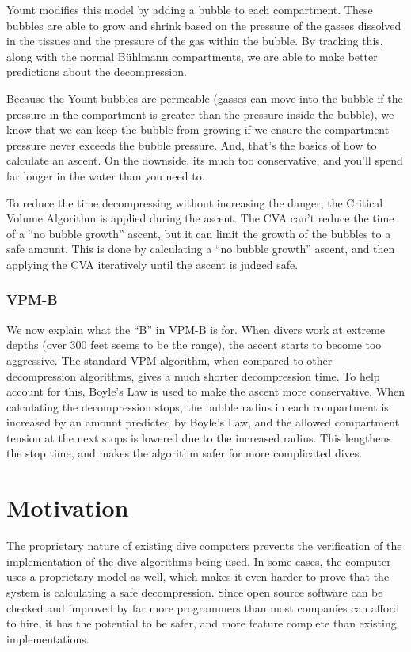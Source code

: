 \documentclass[12pt]{article}
\begin{document}
 Yount modifies this model by adding a bubble to each compartment. These bubbles are able to grow and
shrink based on the pressure of the gasses dissolved in the tissues and the pressure of the gas within the
bubble. By tracking this, along with the normal B\"uhlmann compartments, we are able to make better
predictions about the decompression.

Because the Yount bubbles are permeable (gasses can move into the bubble if the pressure in the compartment
is greater than the pressure inside the bubble), we know that we can keep the bubble from growing if we
ensure the compartment pressure never exceeds the bubble pressure. And, that's the basics of how to calculate
an ascent. On the downside, its much too conservative, and you'll spend far longer in the water than you need
to.

To reduce the time decompressing without increasing the danger, the Critical Volume Algorithm is applied
during the ascent. The CVA can't reduce the time of a ``no bubble growth'' ascent, but it can limit
the growth of the bubbles to a safe amount. This is done by calculating a ``no bubble growth'' ascent,
and then applying the CVA iteratively until the ascent is judged safe.

\subsubsection{VPM-B}

 We now explain what the ``B'' in VPM-B is for. When divers work at extreme
depths (over 300 feet seems to be the range), the ascent starts to become too aggressive. The standard VPM
algorithm, when compared to other decompression algorithms, gives a much shorter decompression time. To help account
for this, Boyle's Law is used to make the ascent more conservative. When calculating the
decompression stops, the bubble radius in each compartment is increased by an amount predicted by Boyle's Law,
and the allowed compartment tension at the next stops is lowered due to the increased radius. This
lengthens the stop time, and makes the algorithm safer for more complicated dives.

\section{Motivation}

The proprietary nature of existing dive computers prevents the verification of the implementation of
the dive algorithms being used. In some cases, the computer uses a proprietary model as well, which
makes it even harder to prove that the system is calculating a safe decompression. Since open source
software can be checked and improved by far more programmers than most companies can afford to hire,
it has the potential to be safer, and more feature complete than existing implementations.
\end{document}

